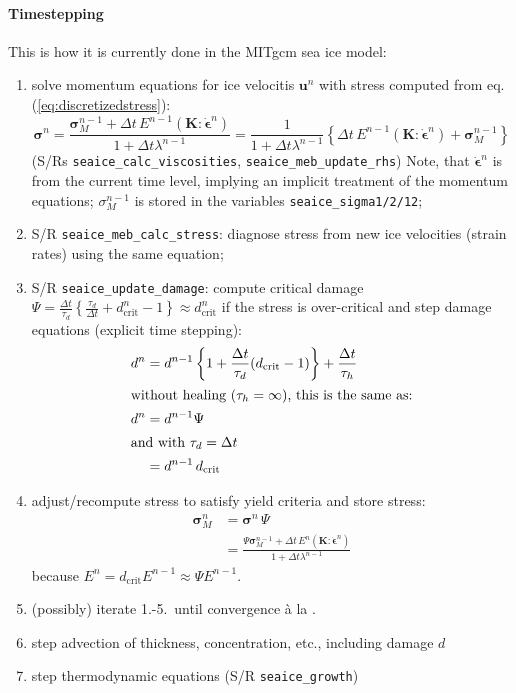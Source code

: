 \documentclass[12pt]{article}
\newcommand{\srb}{\dot{\bm{\epsilon}}}
\begin{document}
\paragraph{Timestepping}
This is how it is currently done in the MITgcm sea ice model:
\begin{enumerate}
\item solve momentum equations for ice velocitis $\bm{u}^{n}$ with stress computed from eq.(\ref{eq:discretizedstress}):
  \[\bm{\sigma}^{n} = \frac{\bm{\sigma}_{M}^{n-1}
      + \Delta{t}\,E^{n-1} (\bm{K}:\srb^{n})}
    {1+\Delta{t}\lambda^{n-1}} = \frac{1}{1+\Delta{t}\lambda^{n-1}}\left\{
      \Delta{t}\,E^{n-1} (\bm{K}:\srb^{n}) + \bm{\sigma}_{M}^{n-1}\right\}
  \]
  (S/Rs \verb+seaice_calc_viscosities+, \verb+seaice_meb_update_rhs+) Note, that $\srb^{n}$ is from the current time level, implying an implicit treatment of the momentum equations; $\sigma_M^{n-1}$ is stored in the variables \verb+seaice_sigma1/2/12+;
\item S/R \verb+seaice_meb_calc_stress+: diagnose stress from new ice velocities (strain rates) using the same equation;
\item S/R \verb+seaice_update_damage+: compute critical damage $\Psi=\frac{\Delta{t}}{\tau_{d}}
  \left\{\frac{\tau_{d}}{\Delta{t}} + d_{\mathrm{crit}}^{n}-1\right\}
  \approx d_{\mathrm{crit}}^{n}$ if the stress is over-critical and step damage equations (explicit time stepping):
  \begin{align}
    \label{eq:damagestepping}
    d^{n} &= d^{n-1}\left\{1
            + \frac{\Delta{t}}{\tau_{d}}(d_{\mathrm{crit}}-1)\right\}
            + \frac{\Delta{t}}{\tau_{h}} \\
            \intertext{without healing ($\tau_h=\infty$), this is the same as:}
    \nonumber d^{n}&=d^{n-1}\Psi \\ 
           \intertext{and with $\tau_d=\Delta{t}$} 
    \nonumber &=d^{n-1}\,d_{\mathrm{crit}}
  \end{align}
\item adjust/recompute stress to satisfy yield criteria and store stress:
  \begin{align}
    \bm{\sigma}_{M}^{n} &= \bm{\sigma}^{n}\,\Psi \\
                       &= \frac{\Psi\bm{\sigma}_{M}^{n-1}
                          + \Delta{t}\,E^{n} (\bm{K}:\srb^{n})}
                          {1+\Delta{t}\lambda^{n-1}}
  \end{align}
  because $E^{n}= d_{\mathrm{crit}} E^{n-1} \approx \Psi E^{n-1}$.
\item (possibly) iterate 1.-5.\ until convergence \`a la \citet{dansereau16:_meb}.
\item step advection of thickness, concentration, etc., including damage $d$
\item step thermodynamic equations (S/R \verb+seaice_growth+)
\end{enumerate}
\end{document}
